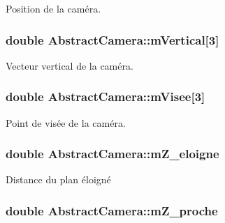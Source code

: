 Position de la caméra. 

\subsubsection[{\texorpdfstring{m\+Vertical}{mVertical}}]{\setlength{\rightskip}{0pt plus 5cm}double Abstract\+Camera\+::m\+Vertical\mbox{[}3\mbox{]}\hspace{0.3cm}{\ttfamily [protected]}}\hypertarget{class_abstract_camera_a64675d12169d6383a9371d7fd710a441}{}\label{class_abstract_camera_a64675d12169d6383a9371d7fd710a441}


Vecteur vertical de la caméra. 

\subsubsection[{\texorpdfstring{m\+Visee}{mVisee}}]{\setlength{\rightskip}{0pt plus 5cm}double Abstract\+Camera\+::m\+Visee\mbox{[}3\mbox{]}\hspace{0.3cm}{\ttfamily [protected]}}\hypertarget{class_abstract_camera_a5c7db642de2add50fad69539a8b220d8}{}\label{class_abstract_camera_a5c7db642de2add50fad69539a8b220d8}


Point de visée de la caméra. 

\subsubsection[{\texorpdfstring{m\+Z\+\_\+eloigne}{mZ_eloigne}}]{\setlength{\rightskip}{0pt plus 5cm}double Abstract\+Camera\+::m\+Z\+\_\+eloigne\hspace{0.3cm}{\ttfamily [protected]}}\hypertarget{class_abstract_camera_a8e076553a55c8e2f19948bdf4ea01be1}{}\label{class_abstract_camera_a8e076553a55c8e2f19948bdf4ea01be1}


Distance du plan éloigné 

\subsubsection[{\texorpdfstring{m\+Z\+\_\+proche}{mZ_proche}}]{\setlength{\rightskip}{0pt plus 5cm}double Abstract\+Camera\+::m\+Z\+\_\+proche\hspace{0.3cm}{\ttfamily [protected]}}\hypertarget{class_abstract_camera_a408e219c2aed42b6aa4f9198c252d10a}{}\label{class_abstract_camera_a408e219c2aed42b6aa4f9198c252d10a}


